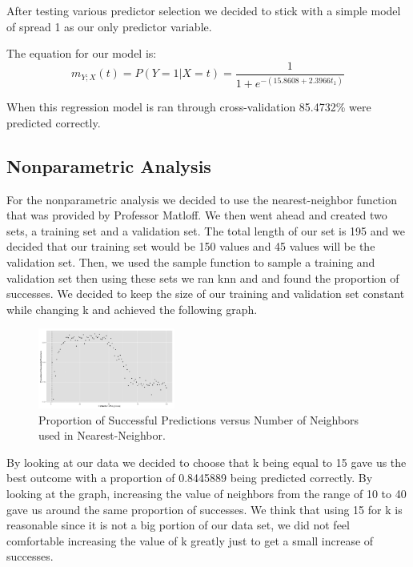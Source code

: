 \documentclass{article}
\begin{document}
After testing various predictor selection we decided to stick with a
simple model of spread 1 as our only predictor variable.

The equation for our model is:
\begin{equation}
\label{logit2}
m_{Y;X}(t) = P(Y = 1 | X = t) = \frac{1}{1+e^{-(15.8608+2.3966
t_1)}}
\end{equation}

When this regression model is ran through cross-validation 85.4732\%
were predicted correctly.  

\subsection{Nonparametric Analysis}

For the nonparametric analysis we decided to use the nearest-neighbor function that was provided by Professor Matloff. We then went ahead and created two sets, a training set and a validation set. The total length of our set is 195 and we decided that our training set would be 150 values and 45 values will be the validation set. Then, we used the sample function to sample a training and validation set then using these sets we ran knn and and found the proportion of successes. We decided to keep the size of our training and validation set constant while changing k and achieved the following graph.

\begin{figure}
  \centering
  \includegraphics[width=0.4\textwidth]{figures/knn_prop_pred.png}
  \caption{Proportion of Successful Predictions versus Number of Neighbors used in Nearest-Neighbor.}
\end{figure}

By looking at our data we decided to choose that k being equal to 15 gave us the best outcome with a proportion of 0.8445889 being predicted correctly. By looking at the graph, increasing the value of neighbors from the range of 10 to 40 gave us around the same proportion of successes. We think that using 15 for k is reasonable since it is not a big portion of our data set, we did not feel comfortable increasing the value of k greatly just to get a small increase of successes.
\end{document}
